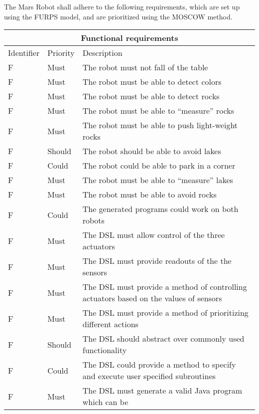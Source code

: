 The Mars Robot shall adhere to the following requirements, which are set up
using the FURPS model, and are prioritized using the MOSCOW method.

\setcounter{TCC}{1}
\begin{table}[H]
	\centering
	\begin{tabular}{|l|l|l|}
		\hline
		\multicolumn{3}{|c|}{Functional requirements} \\  \hline
		\hline
		Identifier & Priority & Description \\  
		\hline
		\hline
		F\doTCC  & Must & The robot must not fall of the table \\  \hline
		F\doTCC  & Must & The robot must be able to detect colors \\  \hline
		F\doTCC  & Must & The robot must be able to detect rocks \\  \hline
		F\doTCC  & Must & The robot must be able to ``measure'' rocks \\  \hline
		F\doTCC  & Must & The robot must be able to push light-weight rocks 
			\\  \hline
		F\doTCC  & Should & The robot should be able to avoid lakes \\  \hline
		F\doTCC  & Could & The robot could be able to park in a corner 
			\\  \hline
		F\doTCC  & Must & The robot must be able to ``measure'' lakes \\  \hline
		F\doTCC & Must & The robot must be able to avoid rocks \\  \hline
		F\doTCC & Could & The generated programs could work on both robots
			\\  \hline
		F\doTCC & Must & The DSL must allow control of the three actuators 
			\\  \hline
		F\doTCC & Must & The DSL must provide readouts of the the sensors
			\\  \hline
		F\doTCC & Must & The DSL must provide a method of controlling actuators
			based on the values of sensors \\  \hline
		F\doTCC & Must & The DSL must provide a method of prioritizing different
			actions \\  \hline
		F\doTCC & Should & The DSL should abstract over commonly used 
			functionality \\  \hline
		F\doTCC & Could & The DSL could provide a method to specify and execute
			user specified subroutines \\  \hline
		F\doTCC & Must & The DSL must generate a valid Java program which can be

\end{tabular}
\end{table}
